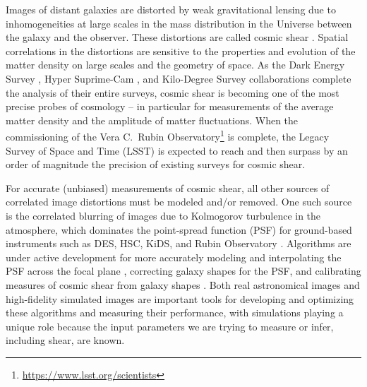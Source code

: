 \documentclass[twocolumn]{aastex631}
\begin{document}
Images of distant galaxies are distorted by weak gravitational lensing due to inhomogeneities at large scales in the mass distribution in the Universe between the galaxy and the observer.  
These distortions are called cosmic shear \citep[see, \eg,][]{kilbinger_cosmology_2015, mandelbaum_weak_2018}. 
Spatial correlations in the distortions are sensitive to the properties and evolution of the matter density on large scales and the geometry of space.  
As the Dark Energy Survey \citep[DES\footnote{\url{https://www.darkenergysurvey.org/}},][]{amon_dark_2022, secco_dark_2022}, Hyper Suprime-Cam \citep[HSC\footnote{\url{https://hsc.mtk.nao.ac.jp/ssp/}},][]{li_hyper_2023, dalal_hyper_2023}, and Kilo-Degree Survey \citep[KiDS\footnote{\url{http://kids.strw.leidenuniv.nl/}},][]{asgari_kids-1000_2021} collaborations complete the analysis of their entire surveys, cosmic shear is becoming one of the most precise probes of cosmology -- in particular for measurements of the average matter density and the amplitude of matter fluctuations.
When the commissioning of the Vera C.~Rubin Observatory\footnote{\url{https://www.lsst.org/scientists}} is complete, the Legacy Survey of Space and Time (LSST) is expected to reach and then surpass by an order of magnitude the precision of existing surveys for cosmic shear. 

For accurate (unbiased) measurements of cosmic shear, all other sources of correlated image distortions must be modeled and/or removed. 
One such source is the correlated blurring of images due to Kolmogorov turbulence in the atmosphere, which dominates the point-spread function (PSF) for ground-based instruments such as DES, HSC, KiDS, and Rubin Observatory \citep[\eg,][]{heymans_impact_2012,jarvis_science_2016, xin_study_2018}. 
Algorithms are under active development for more accurately modeling and interpolating the PSF across the focal plane \citep[see, \eg,][]{bertin_automated_2011, jarvis_dark_2020}, correcting galaxy shapes for the PSF, and calibrating measures of cosmic shear from galaxy shapes \citep{sheldon_practical_2017, huff_metacalibration_2017, gatti_dark_2021, sheldon_metadetection_2023}.  
Both real astronomical images and high-fidelity simulated images are important tools for developing and optimizing these algorithms and measuring their performance, with simulations playing a unique role because the input parameters we are trying to measure or infer, including shear, are known.  
\end{document}
